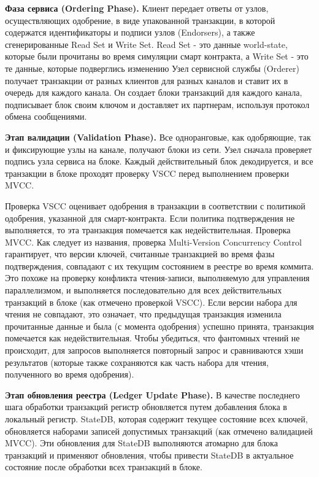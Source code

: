 \textbf{Фаза сервиса (Ordering Phase).} Клиент передает ответы от узлов, осуществляющих одобрение, в виде упакованной транзакции, в которой содержатся идентификаторы и подписи узлов (Endorsers), а также сгенерированные Read Set и Write Set. Read Set - это данные world-state, которые были прочитаны во время симуляции смарт контракта, а Write Set - это те данные, которые подверглись изменению
Узел сервисной службы (Orderer) получает транзакции от разных клиентов для разных каналов и ставит их в очередь для каждого канала. Он создает блоки транзакций для каждого канала, подписывает блок своим ключом и доставляет их партнерам, используя протокол обмена сообщениями.

\textbf{Этап валидации (Validation Phase).} Все одноранговые, как одобряющие, так и фиксирующие узлы на канале, получают блоки из сети. Узел сначала проверяет подпись узла сервиса на блоке. Каждый действительный блок декодируется, и все транзакции в блоке проходят проверку VSCC перед выполнением проверки MVCC.

Проверка	VSCC	оценивает	одобрения	в	транзакции	в		соответствии	с политикой	одобрения,		указанной	для	смарт-контракта.		Если	политика подтверждения не выполняется, то эта транзакция помечается как недействительная. Проверка MVCC. Как следует из названия, проверка Multi-Version Concurrency Control гарантирует, что версии ключей, считанные транзакцией во время фазы подтверждения, совпадают с их текущим состоянием в реестре во время коммита. Это похоже на проверку конфликта чтения-записи, выполняемую для управления параллелизмом, и выполняется последовательно для всех действительных транзакций в блоке (как отмечено проверкой VSCC). Если версии набора для чтения не совпадают, это означает, что предыдущая транзакция изменила прочитанные данные и была (с момента одобрения) успешно принята, транзакция помечается как недействительная. Чтобы убедиться, что фантомных чтений не происходит, для запросов выполняется повторный запрос и сравниваются хэши результатов (которые также сохраняются как часть набора для чтения, полученного во время одобрения).

\textbf{Этап обновления реестра (Ledger Update Phase).} В качестве последнего шага обработки транзакций регистр обновляется путем добавления блока в локальный регистр. StateDB, которая содержит текущее состояние всех ключей, обновляется наборами записей допустимых транзакций (как отмечено валидацией MVCC). Эти обновления для StateDB выполняются атомарно для блока транзакций и применяют обновления, чтобы привести StateDB в актуальное состояние после обработки всех транзакций в блоке.

